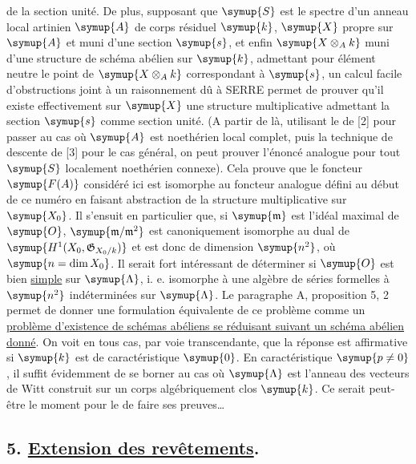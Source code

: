 de la section unité. De plus, supposant que $\symup{S}$ est le spectre d'un anneau
local artinien $\symup{A}$ de corps résiduel $\symup{k}$, $\symup{X}$ propre sur $\symup{A}$ et muni d'une
section $\symup{s}$, et enfin $\symup{X\otimes_Ak}$ muni d'une structure de schéma abélien sur
$\symup{k}$, admettant pour élément neutre le point de $\symup{X\otimes_Ak}$ correspondant à
$\symup{s}$, un calcul facile d'obstructions joint à un raisonnement dû à SERRE permet
de prouver qu'il existe effectivement sur $\symup{X}$ une structure multiplicative
admettant la section $\symup{s}$ comme section unité. (A partir de là, utilisant le
 de [2] pour passer au cas où $\symup{A}$ est noethérien local
complet, puis la technique de descente de [3] pour le cas général, on peut
prouver l'énoncé analogue pour tout $\symup{S}$ localement noethérien connexe). Cela
prouve que le foncteur $\symup{F(A)}$ considéré ici est isomorphe au foncteur analogue
défini au début de ce numéro en faisant abstraction de la structure
multiplicative sur $\symup{X_0}$. Il s'ensuit en particulier que, si $\symup{\mathfrak m}$ est
l'idéal maximal de $\symup{O}$, $\symup{\mathfrak m/\mathfrak m^2}$ est canoniquement
isomorphe au dual de $\symup{H^1(X_0,\mathfrak G_{X_0/k})}$ et est donc de dimension $\symup{n^2}$,
où $\symup{n=\dim X_0}$. Il serait fort intéressant de déterminer si $\symup{O}$ est bien
\uline{simple} sur $\symup{\Lambda}$, i. e. isomorphe à une algèbre de séries formelles à $\symup{n^2}$
indéterminées sur $\symup{\Lambda}$. Le paragraphe A, proposition 5, 2 permet de donner
une formulation équivalente de ce problème comme un \uline{problème d'existence de
schémas abéliens se réduisant suivant un schéma abélien donné}. On voit en tous
cas, par voie transcendante, que la réponse est affirmative si $\symup{k}$ est de
caractéristique $\symup{0}$. En caractéristique $\symup{p\ne0}$, il suffit évidemment de se
borner au cas où $\symup{\Lambda}$ est l'anneau des vecteurs de Witt construit sur un
corps algébriquement clos $\symup{k}$. Ce serait peut-être le moment pour le  de faire ses preuves\ldots

\subsection*{\textnormal{5. \uline{Extension des revêtements}.}}

